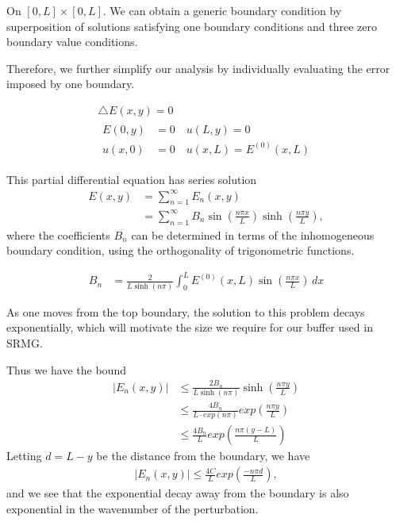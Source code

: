 \documentclass[final]{siamart1116}
\numberwithin{theorem}{section}
\begin{document}
On $[0,L]\times[0,L]$. We can obtain a generic boundary condition by superposition of solutions satisfying one boundary conditions and three zero boundary value conditions. 

Therefore, we further simplify our analysis by individually evaluating the error imposed by one boundary. 

\begin{gather}
  \bigtriangleup  E(x,y) = 0 \label{laplaceexstate} \\
  \begin{split}
    E(0,y) &= 0 \quad u(L,y) = 0 \\
    u(x,0) &= 0 \quad u(x,L) = E^{(0)}(x, L) \label{laplaceexboundary} \nonumber 
  \end{split}
\end{gather}

This partial differential equation has series
solution \cite{Jackson1962}
\begin{align}
  E(x,y) &= \sum_{n=1}^{\infty} E_n(x,y) \label{errorinfreq} \\
            &= \sum_{n=1}^{\infty} B_n \sin\left(\frac{n\pi x}{L}\right) \sinh\left(\frac{n\pi y}{L}\right), \nonumber 
\end{align}
where the coefficients $B_n$ can be determined in terms of the inhomogeneous boundary condition, using the orthogonality of trigonometric functions. 

\begin{align*}
  B_n &= \frac{2}{L \sinh(n\pi)} \int^L_0 E^{(0)}(x, L) \sin\left(\frac{n\pi x}{L}\right) \,dx
\end{align*}

As one moves from the top boundary, the solution to this problem decays exponentially, which will motivate the size we require for our buffer used in SRMG.



Thus we have the bound
\begin{align*}
\left|E_n(x, y)\right| &\leq \frac{2 B_n}{L \sinh(n\pi)} \sinh\left(\frac{n \pi y}{L}\right) \\
&\leq \frac{4 B_n}{L \cdot exp(n\pi)} exp({\frac{n \pi y}{L}}) \\
&\leq \frac{4 B_n}{L} exp({\frac{n \pi (y-L)}{L}}) 
\end{align*}
Letting $d = L-y$ be the distance from the boundary, we have
\begin{align}
  \left|E_n(x, y)\right| \leq \frac{4C}{L} exp({\frac{-n \pi d}{L}}), \label{errorbound}
\end{align}
and we see that the exponential decay away from the boundary is also exponential in the wavenumber of the perturbation.
\end{document}
